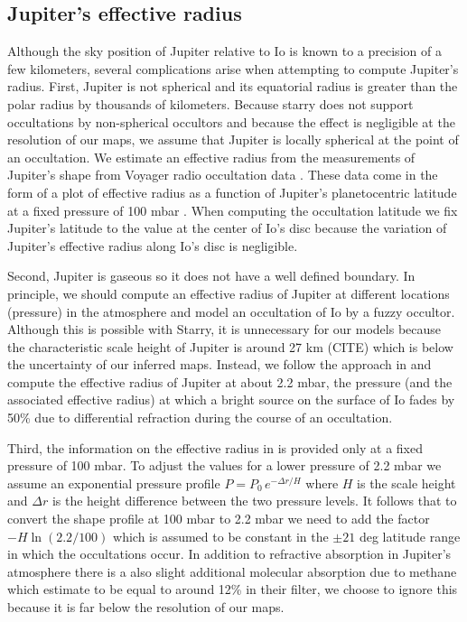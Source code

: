\documentclass[modern]{aastex62}
\begin{document}
\subsection{Jupiter's effective radius}
Although the sky position of Jupiter relative to Io is known to a precision of a few kilometers, several complications arise when attempting to compute Jupiter's radius.
First, Jupiter is not spherical and its equatorial radius is greater than the polar radius by thousands of kilometers. 
Because \textsf{starry} does not support occultations by non-spherical occultors and because the effect is negligible at the resolution of our maps, we assume that Jupiter is locally spherical at the point of an occultation. 
We estimate an effective radius from the measurements of Jupiter's shape from Voyager radio occultation data \citep{lindal1981}.
These data come in the form of a plot of effective radius  as a function of Jupiter's planetocentric latitude at a fixed pressure of 100 mbar \citep[Fig.~7 in ][]{lindal1981}.
When computing the occultation latitude we fix Jupiter's latitude to the value at the center of Io's disc because 
the variation of Jupiter's effective radius along Io's disc is negligible.


Second, Jupiter is gaseous so it does not have a well defined boundary.
In principle, we should compute an effective radius of Jupiter at different locations (pressure) in the atmosphere and model an occultation of Io by a fuzzy occultor.
Although this is possible with Starry, it is unnecessary for our models because the characteristic scale height of Jupiter is around 27 km (CITE) which is below the uncertainty of our inferred maps.
Instead, we follow the approach in \cite{spencer1990} and compute the effective radius of Jupiter at about 2.2 mbar, the pressure (and the associated effective radius) at which a  bright source on the surface of Io fades by 50\% due to differential refraction during the course of an occultation.

Third, the information on the effective radius in \citep{lindal1981} is provided only at a fixed pressure of 100 mbar.
To adjust the values for a lower pressure of 2.2 mbar we assume an exponential pressure profile $P=P_0\, e^{-\Delta r/H}$ where $H$ is the scale height and $\Delta r$ is the height difference between the two pressure levels.
It follows that to convert the shape profile at 100 mbar to 2.2 mbar we need to add the factor
$-H\ln(2.2/100)$ which is assumed to be constant in the $\pm 21$ deg latitude range in which the occultations occur.
In addition to refractive absorption in Jupiter's atmosphere there is a also slight additional molecular absorption due to methane which \cite{spencer1990} estimate to be equal to around 12\% in their filter, we choose to ignore this because it is far below the resolution of our maps.
\end{document}
